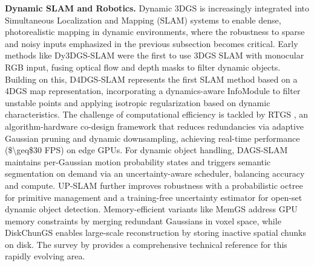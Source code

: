 \documentclass[11pt]{article}
\begin{document}
\textbf{Dynamic SLAM and Robotics.} Dynamic 3DGS is increasingly integrated into Simultaneous Localization and Mapping (SLAM) systems to enable dense, photorealistic mapping in dynamic environments, where the robustness to sparse and noisy inputs emphasized in the previous subsection becomes critical. Early methods like Dy3DGS-SLAM \cite{ref401} were the first to use 3DGS SLAM with monocular RGB input, fusing optical flow and depth masks to filter dynamic objects. Building on this, D4DGS-SLAM \cite{ref402} represents the first SLAM method based on a 4DGS map representation, incorporating a dynamics-aware InfoModule to filter unstable points and applying isotropic regularization based on dynamic characteristics. The challenge of computational efficiency is tackled by RTGS \cite{ref403}, an algorithm-hardware co-design framework that reduces redundancies via adaptive Gaussian pruning and dynamic downsampling, achieving real-time performance (\$\textbackslash geq\$30 FPS) on edge GPUs. For dynamic object handling, DAGS-SLAM \cite{ref404} maintains per-Gaussian motion probability states and triggers semantic segmentation on demand via an uncertainty-aware scheduler, balancing accuracy and compute. UP-SLAM \cite{ref405} further improves robustness with a probabilistic octree for primitive management and a training-free uncertainty estimator for open-set dynamic object detection. Memory-efficient variants like MemGS \cite{ref53} address GPU memory constraints by merging redundant Gaussians in voxel space, while DiskChunGS \cite{ref406} enables large-scale reconstruction by storing inactive spatial chunks on disk. The survey by \cite{ref407} provides a comprehensive technical reference for this rapidly evolving area.
\end{document}
